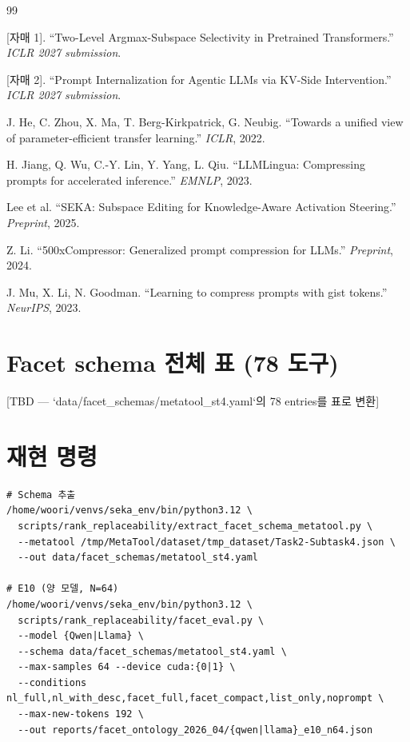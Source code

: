 \documentclass[11pt]{article}
\theoremstyle{plain}
\theoremstyle{definition}
\theoremstyle{remark}
\begin{document}
\begin{thebibliography}{99}

[자매 1].
``Two-Level Argmax-Subspace Selectivity in Pretrained Transformers.''
\emph{ICLR 2027 submission}.

[자매 2].
``Prompt Internalization for Agentic LLMs via KV-Side Intervention.''
\emph{ICLR 2027 submission}.

J. He, C. Zhou, X. Ma, T. Berg-Kirkpatrick, G. Neubig.
``Towards a unified view of parameter-efficient transfer learning.''
\emph{ICLR}, 2022.

H. Jiang, Q. Wu, C.-Y. Lin, Y. Yang, L. Qiu.
``LLMLingua: Compressing prompts for accelerated inference.''
\emph{EMNLP}, 2023.

Lee et al.
``SEKA: Subspace Editing for Knowledge-Aware Activation Steering.''
\emph{Preprint}, 2025.

Z. Li.
``500xCompressor: Generalized prompt compression for LLMs.''
\emph{Preprint}, 2024.

J. Mu, X. Li, N. Goodman.
``Learning to compress prompts with gist tokens.''
\emph{NeurIPS}, 2023.

\end{thebibliography}

\appendix

\section{Facet schema 전체 표 (78 도구)}
\label{app:facet-table}

[TBD — `data/facet_schemas/metatool_st4.yaml`의 78 entries를 표로 변환]

\section{재현 명령}
\label{app:reproduce}

\begin{verbatim}
# Schema 추출
/home/woori/venvs/seka_env/bin/python3.12 \
  scripts/rank_replaceability/extract_facet_schema_metatool.py \
  --metatool /tmp/MetaTool/dataset/tmp_dataset/Task2-Subtask4.json \
  --out data/facet_schemas/metatool_st4.yaml

# E10 (양 모델, N=64)
/home/woori/venvs/seka_env/bin/python3.12 \
  scripts/rank_replaceability/facet_eval.py \
  --model {Qwen|Llama} \
  --schema data/facet_schemas/metatool_st4.yaml \
  --max-samples 64 --device cuda:{0|1} \
  --conditions nl_full,nl_with_desc,facet_full,facet_compact,list_only,noprompt \
  --max-new-tokens 192 \
  --out reports/facet_ontology_2026_04/{qwen|llama}_e10_n64.json
\end{verbatim}
\end{document}
